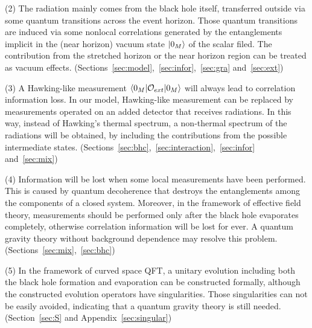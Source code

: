 \documentclass[12pt,a4paper]{article}
\begin{document}
(2) The radiation mainly comes from the black hole itself, transferred outside via some quantum
transitions across the event horizon. Those quantum transitions are induced via some nonlocal correlations
generated by the entanglements implicit in the (near horizon) vacuum state $\arrowvert0_{M}\rangle$ of the
scalar filed. The contribution from the stretched horizon or the near horizon region can be treated as vacuum effects.
 (Sections~\ref{sec:model},~\ref{sec:infor},~\ref{sec:gra} and~\ref{sec:ext})

(3) A Hawking-like measurement $\langle0_M\arrowvert\mathcal{O}_{ext}\arrowvert0_M\rangle$ will always lead to correlation information loss. In our model, Hawking-like measurement can be replaced by measurements operated on an added detector that receives radiations. In this way, instead of Hawking's
thermal spectrum, a non-thermal spectrum of the radiations will be obtained, by including the contributions from the possible intermediate states. (Sections~\ref{sec:bhc},~\ref{sec:interaction},~\ref{sec:infor} and~\ref{sec:mix})

(4) Information will be lost when some local measurements
have been performed. This is caused by quantum decoherence
that destroys the entanglements among the components of a
closed system. Moreover, in the framework of effective field theory, measurements should be performed only after the black hole evaporates completely, otherwise correlation information will be lost for ever. A quantum gravity theory without background dependence may resolve this problem. (Sections~\ref{sec:mix},~\ref{sec:bhc})

(5) In the framework of curved space QFT, a unitary evolution including both the black hole formation and evaporation can be constructed formally, although the constructed evolution operators have singularities. Those singularities can not be easily avoided, indicating that a quantum gravity theory is still needed. (Section~\ref{sec:S} and Appendix~\ref{sec:singular})
\end{document}
